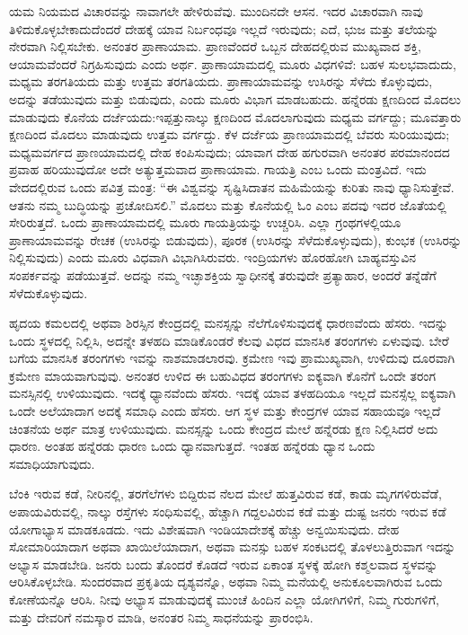 ಯಮ ನಿಯಮದ ವಿಚಾರವನ್ನು ನಾವಾಗಲೇ ಹೇಳಿರುವೆವು. ಮುಂದಿನದೇ ಆಸನ. ಇದರ ವಿಚಾರವಾಗಿ ನಾವು ತಿಳಿದುಕೊಳ್ಳಬೇಕಾದುದೆಂದರೆ ದೇಹಕ್ಕೆ ಯಾವ ನಿರ್ಬಂಧವೂ ಇಲ್ಲದೆ ಇರುವುದು; ಎದೆ, ಭುಜ ಮತ್ತು ತಲೆಯನ್ನು ನೇರವಾಗಿ ನಿಲ್ಲಿಸಬೇಕು. ಅನಂತರ ಪ್ರಾಣಾಯಾಮ. ಪ್ರಾಣವೆಂದರೆ ಒಬ್ಬನ ದೇಹದಲ್ಲಿರುವ ಮುಖ್ಯವಾದ ಶಕ್ತಿ, ಆಯಾಮವೆಂದರೆ ನಿಗ್ರಹಿಸುವುದು ಎಂದು ಅರ್ಥ. ಪ್ರಾಣಾಯಾಮದಲ್ಲಿ ಮೂರು ವಿಧಗಳಿವೆ: ಬಹಳ ಸುಲಭವಾದುದು, ಮಧ್ಯಮ ತರಗತಿಯದು ಮತ್ತು ಉತ್ತಮ ತರಗತಿಯದು. ಪ್ರಾಣಾಯಾಮವನ್ನು ಉಸಿರನ್ನು ಸೆಳೆದು ಕೊಳ್ಳುವುದು, ಅದನ್ನು ತಡೆಯುವುದು ಮತ್ತು ಬಿಡುವುದು, ಎಂದು ಮೂರು ವಿಭಾಗ ಮಾಡಬಹುದು. ಹನ್ನೆರಡು ಕ್ಷಣದಿಂದ ಮೊದಲು ಮಾಡುವುದು ಕೊನೆಯ ದರ್ಜೆಯದು:ಇಪ್ಪತ್ತುನಾಲ್ಕು ಕ್ಷಣದಿಂದ ಮೊದಲಾಗುವುದು ಮಧ್ಯಮ ವರ್ಗದ್ದು; ಮೂವತ್ತಾರು ಕ್ಷಣದಿಂದ ಮೊದಲು ಮಾಡುವುದು ಉತ್ತಮ ವರ್ಗದ್ದು. ಕೆಳ ದರ್ಜೆಯ ಪ್ರಾಣಯಾಮದಲ್ಲಿ ಬೆವರು ಸುರಿಯುವುದು; ಮಧ್ಯಮವರ್ಗದ ಪ್ರಾಣಯಾಮದಲ್ಲಿ ದೇಹ ಕಂಪಿಸುವುದು; ಯಾವಾಗ ದೇಹ ಹಗುರವಾಗಿ ಅನಂತರ ಪರಮಾನಂದದ ಪ್ರವಾಹ ಹರಿಯುವುದೋ ಅದೇ ಅತ್ಯುತ್ತಮವಾದ ಪ್ರಾಣಾಯಾಮ. ಗಾಯತ್ರಿ ಎಂಬ ಒಂದು ಮಂತ್ರವಿದೆ. ಇದು ವೇದದಲ್ಲಿರುವ ಒಂದು ಪವಿತ್ರ ಮಂತ್ರ: “ಈ ವಿಶ್ವವನ್ನು ಸೃಷ್ಟಿಸಿದಾತನ ಮಹಿಮೆಯನ್ನು ಕುರಿತು ನಾವು ಧ್ಯಾನಿಸುತ್ತೇವೆ. ಆತನು ನಮ್ಮ ಬುದ್ಧಿಯನ್ನು ಪ್ರಚೋದಿಸಲಿ.” ಮೊದಲು ಮತ್ತು ಕೊನೆಯಲ್ಲಿ ಓಂ ಎಂಬ ಪದವು ಇದರ ಜೊತೆಯಲ್ಲಿ ಸೇರಿರುತ್ತದೆ. ಒಂದು ಪ್ರಾಣಾಯಾಮದಲ್ಲಿ ಮೂರು ಗಾಯತ್ರಿಯನ್ನು ಉಚ್ಚರಿಸಿ. ಎಲ್ಲಾ ಗ್ರಂಥಗಳಲ್ಲಿಯೂ ಪ್ರಾಣಾಯಾಮವನ್ನು ರೇಚಕ (ಉಸಿರನ್ನು ಬಿಡುವುದು), ಪೂರಕ (ಉಸಿರನ್ನು ಸೆಳೆದುಕೊಳ್ಳುವುದು), ಕುಂಭಕ (ಉಸಿರನ್ನು ನಿಲ್ಲಿಸುವುದು) ಎಂದು ಮೂರು ವಿಧವಾಗಿ ವಿಭಾಗಿಸಿರುವರು. ಇಂದ್ರಿಯಗಳು ಹೊರಹೋಗಿ ಬಾಹ್ಯವಸ್ತುವಿನ ಸಂಪರ್ಕವನ್ನು ಪಡೆಯುತ್ತವೆ. ಅದನ್ನು ನಮ್ಮ ಇಚ್ಛಾಶಕ್ತಿಯ ಸ್ವಾಧೀನಕ್ಕೆ ತರುವುದೇ ಪ್ರತ್ಯಾಹಾರ, ಅಂದರೆ ತನ್ನೆಡೆಗೆ ಸೆಳೆದುಕೊಳ್ಳುವುದು. 

ಹೃದಯ ಕಮಲದಲ್ಲಿ ಅಥವಾ ಶಿರಸ್ಸಿನ ಕೇಂದ್ರದಲ್ಲಿ ಮನಸ್ಸನ್ನು ನೆಲೆಗೊಳಿಸುವುದಕ್ಕೆ ಧಾರಣವೆಂದು ಹೆಸರು. ಇದನ್ನು ಒಂದು ಸ್ಥಳದಲ್ಲಿ ನಿಲ್ಲಿಸಿ, ಅದನ್ನೇ ತಳಹದಿ ಮಾಡಿಕೊಂಡರೆ ಕೆಲವು ವಿಧದ ಮಾನಸಿಕ ತರಂಗಗಳು ಏಳುವುವು. ಬೇರೆ ಬಗೆಯ ಮಾನಸಿಕ ತರಂಗಗಳು ಇವನ್ನು ನಾಶಮಾಡಲಾರವು. ಕ್ರಮೇಣ ಇವು ಪ್ರಾಮುಖ್ಯವಾಗಿ, ಉಳಿದುವು ದೂರವಾಗಿ ಕ್ರಮೇಣ ಮಾಯವಾಗುವುವು. ಅನಂತರ ಉಳಿದ ಈ ಬಹುವಿಧದ ತರಂಗಗಳು ಐಕ್ಯವಾಗಿ ಕೊನೆಗೆ ಒಂದೇ ತರಂಗ ಮನಸ್ಸಿನಲ್ಲಿ ಉಳಿಯುವುದು. ಇದಕ್ಕೆ ಧ್ಯಾನವೆಂದು ಹೆಸರು. ಇದಕ್ಕೆ ಯಾವ ತಳಹದಿಯೂ ಇಲ್ಲದೆ ಮನಸ್ಸೆಲ್ಲ ಐಕ್ಯವಾಗಿ ಒಂದೇ ಅಲೆಯಾದಾಗ ಅದಕ್ಕೆ ಸಮಾಧಿ ಎಂದು ಹೆಸರು. ಆಗ ಸ್ಥಳ ಮತ್ತು ಕೇಂದ್ರಗಳ ಯಾವ ಸಹಾಯವೂ ಇಲ್ಲದೆ ಚಿಂತನೆಯ ಅರ್ಥ ಮಾತ್ರ ಉಳಿಯುವುದು. ಮನಸ್ಸನ್ನು ಒಂದು ಕೇಂದ್ರದ ಮೇಲೆ ಹನ್ನೆರಡು ಕ್ಷಣ ನಿಲ್ಲಿಸಿದರೆ ಅದು ಧಾರಣ. ಅಂತಹ ಹನ್ನೆರಡು ಧಾರಣ ಒಂದು ಧ್ಯಾನವಾಗುತ್ತದೆ. ಇಂತಹ ಹನ್ನೆರಡು ಧ್ಯಾನ ಒಂದು ಸಮಾಧಿಯಾಗುವುದು. 

ಬೆಂಕಿ ಇರುವ ಕಡೆ, ನೀರಿನಲ್ಲಿ, ತರಗೆಲೆಗಳು ಬಿದ್ದಿರುವ ನೆಲದ ಮೇಲೆ ಹುತ್ತವಿರುವ ಕಡೆ, ಕಾಡು ಮೃಗಗಳಿರುವೆಡೆ, ಅಪಾಯವಿರುವಲ್ಲಿ, ನಾಲ್ಕು ರಸ್ತೆಗಳು ಸಂಧಿಸುವಲ್ಲಿ, ಹೆಚ್ಚಾಗಿ ಗದ್ದಲವಿರುವ ಕಡೆ ಮತ್ತು ದುಷ್ಟ ಜನರು ಇರುವ ಕಡೆ ಯೋಗಾಭ್ಯಾಸ ಮಾಡಕೂಡದು. ಇದು ವಿಶೇಷವಾಗಿ ಇಂಡಿಯಾದೇಶಕ್ಕೆ ಹೆಚ್ಚು ಅನ್ವಯಿಸುವುದು. ದೇಹ ಸೋಮಾರಿಯಾದಾಗ ಅಥವಾ ಖಾಯಿಲೆಯಾದಾಗ, ಅಥವಾ ಮನಸ್ಸು ಬಹಳ ಸಂಕಟದಲ್ಲಿ ತೊಳಲುತ್ತಿರುವಾಗ ಇದನ್ನು ಅಭ್ಯಾಸ ಮಾಡಬೇಡಿ. ಜನರು ಬಂದು ತೊಂದರೆ ಕೊಡದೆ ಇರುವ ಏಕಾಂತ ಸ್ಥಳಕ್ಕೆ ಹೋಗಿ ಕಶ್ಮಲವಾದ ಸ್ಥಳವನ್ನು ಆರಿಸಿಕೊಳ್ಳಬೇಡಿ. ಸುಂದರವಾದ ಪ್ರಕೃತಿಯ ದೃಶ್ಯವನ್ನೊ, ಅಥವಾ ನಿಮ್ಮ ಮನೆಯಲ್ಲಿ ಅನುಕೂಲವಾಗಿರುವ ಒಂದು ಕೋಣೆಯನ್ನೊ ಆರಿಸಿ. ನೀವು ಅಭ್ಯಾಸ ಮಾಡುವುದಕ್ಕೆ ಮುಂಚೆ ಹಿಂದಿನ ಎಲ್ಲಾ ಯೋಗಿಗಳಿಗೆ, ನಿಮ್ಮ ಗುರುಗಳಿಗೆ, ಮತ್ತು ದೇವರಿಗೆ ನಮಸ್ಕಾರ ಮಾಡಿ, ಅನಂತರ ನಿಮ್ಮ ಸಾಧನೆಯನ್ನು ಪ್ರಾರಂಭಿಸಿ. 

